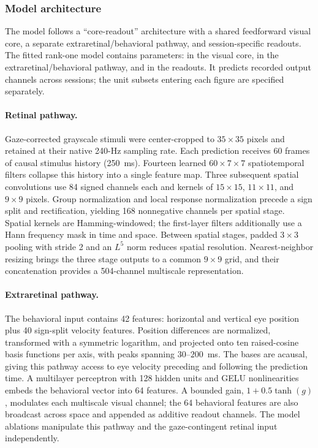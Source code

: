 \documentclass{lite}
\begin{document}
\subsubsection{Model architecture}
The model follows a ``core-readout'' architecture \cite{wang2025foundation} with a shared feedforward visual core, a separate extraretinal/behavioral pathway, and session-specific readouts. The fitted rank-one model contains \ModelParameters{} parameters: \ModelVisualParameters{} in the visual core, \ModelBehaviorParameters{} in the extraretinal/behavioral pathway, and \ModelReadoutParameters{} in the readouts. It predicts \ModelOutputChannels{} recorded output channels across \ModelSessions{} sessions; the unit subsets entering each figure are specified separately.

\paragraph{Retinal pathway.} Gaze-corrected grayscale stimuli \cite{yates2023detailed} were center-cropped to $35\times35$ pixels and retained at their native 240-Hz sampling rate. Each prediction receives 60 frames of causal stimulus history (250~ms). Fourteen learned $60\times7\times7$ spatiotemporal filters collapse this history into a single feature map. Three subsequent spatial convolutions use 84 signed channels each and kernels of $15\times15$, $11\times11$, and $9\times9$ pixels. Group normalization and local response normalization precede a sign split and rectification, yielding 168 nonnegative channels per spatial stage. Spatial kernels are Hamming-windowed; the first-layer filters additionally use a Hann frequency mask in time and space. Between spatial stages, padded $3\times3$ pooling with stride 2 and an $L^5$ norm reduces spatial resolution. Nearest-neighbor resizing brings the three stage outputs to a common $9\times9$ grid, and their concatenation provides a 504-channel multiscale representation.

\paragraph{Extraretinal pathway.} The behavioral input contains 42 features: horizontal and vertical eye position plus 40 sign-split velocity features. Position differences are normalized, transformed with a symmetric logarithm, and projected onto ten raised-cosine basis functions per axis, with peaks spanning $30$--$200$~ms. The bases are acausal, giving this pathway access to eye velocity preceding and following the prediction time. A multilayer perceptron with 128 hidden units and GELU nonlinearities embeds the behavioral vector into 64 features. A bounded gain, $1+0.5\tanh(g)$, modulates each multiscale visual channel; the 64 behavioral features are also broadcast across space and appended as additive readout channels. The model ablations manipulate this pathway and the gaze-contingent retinal input independently.
\end{document}
